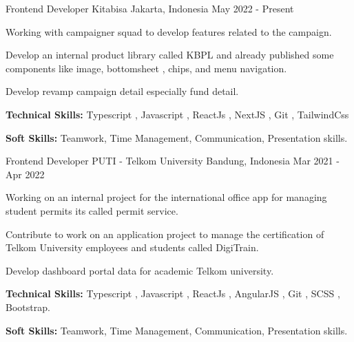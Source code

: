 

\begin{cventries}

  \cventry
    {Frontend Developer} %
    {Kitabisa} %
    {Jakarta, Indonesia} %
    {May 2022 - Present} %
    {
      \begin{cvitems} %
        \item {Working with campaigner squad to develop features related to the campaign.}
         \item {Develop an internal product library called KBPL and already published some components like image, bottomsheet , chips, and menu navigation.}
         \item { Develop revamp campaign detail especially fund detail. }
        \item {\textbf{Technical Skills:} Typescript , Javascript , ReactJs , NextJS , Git , TailwindCss}
        \item {\textbf{Soft Skills:} Teamwork, Time Management, Communication, Presentation skills.}
      \end{cvitems}
    }
    
  \cventry
    {Frontend Developer} %
    {PUTI - Telkom University} %
    {Bandung, Indonesia} %
    {Mar 2021 - Apr 2022} %
    {
      \begin{cvitems} %
        \item {Working on an internal project for the international office app for managing student permits its called permit service.}
        \item {Contribute to work on an application project to manage the certification of Telkom University employees and students called DigiTrain.}
        \item {Develop dashboard portal data for academic Telkom university.}
        \item {\textbf{Technical Skills:} Typescript , Javascript , ReactJs , AngularJS , Git , SCSS , Bootstrap.}
        \item {\textbf{Soft Skills:} Teamwork, Time Management, Communication, Presentation skills.}
      \end{cvitems}
    }
    

\end{cventries}
